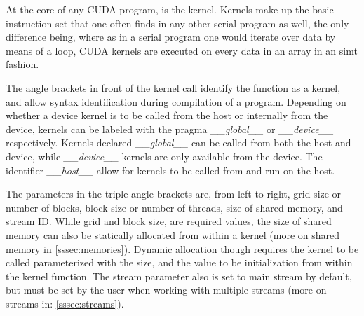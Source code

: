 At the core of any CUDA program, is the kernel. Kernels make up the basic instruction
set that one often finds in any other serial program as well, the only difference being,
where as in a serial program one would iterate over data by means of a loop,
CUDA kernels are executed on every data in an array in an \gls{simt} fashion.


The angle brackets in front of the kernel call identify the function as a kernel,
and allow syntax  identification during compilation of a program.  Depending on
whether a device kernel is to be called from the host or internally from the device,
kernels can be labeled with the pragma \textit{\_\_global\_\_} or \textit{\_\_device\_\_}  respectively.
Kernels declared \textit{\_\_global\_\_} can be called from both the host and device, while \textit{\_\_device\_\_}
kernels are only available from the device.
The identifier \textit{\_\_host\_\_} allow for kernels to be called from and run on the host.

The parameters in the triple angle brackets are, from left to right, grid size or number of blocks,
block size or number of threads, size of shared memory, and stream ID.  While grid and block size,
are required values, the size of shared memory can also be statically allocated from within
a kernel (more on shared memory in \ref{sssec:memories}).  Dynamic allocation though requires the kernel to be called parameterized with
the size, and the value to be initialization from within the kernel function.  The stream
parameter also is set to main stream by default, but must be set by the user when
working with multiple streams (more on streams in: \ref{sssec:streams}).
